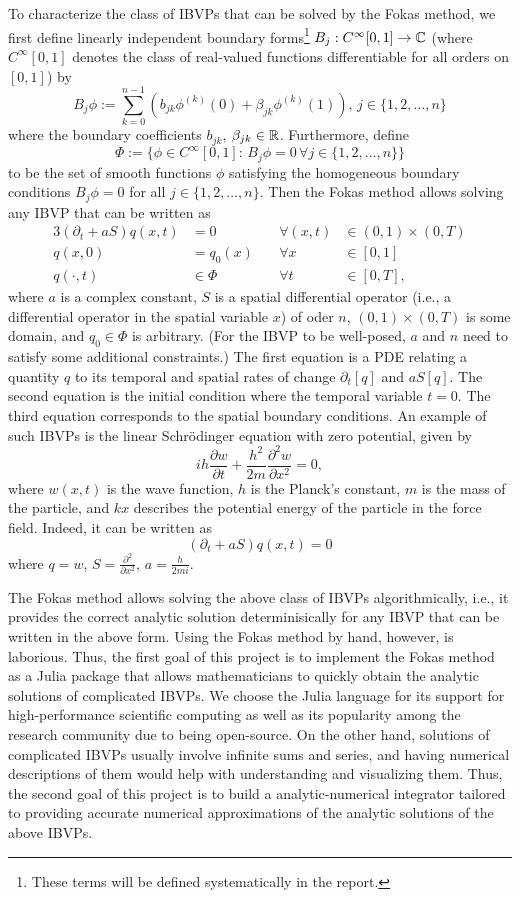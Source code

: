 \documentclass[11pt, oneside, a4paper]{article}
\begin{document}
To characterize the class of IBVPs that can be solved by the Fokas method\cite[p.9]{Smith2016}, we first define linearly independent boundary forms\footnote{These terms will be defined systematically in the report.} $B_j: C^\infty[0,1]\to \mathbb C$ (where $C^\infty[0,1]$ denotes the class of real-valued functions differentiable for all orders on $[0,1]$) by
\[B_j\phi := \sum_{k=0}^{n-1}\left(b_{jk}\phi^{(k)}(0) + \beta_{jk}\phi^{(k)}(1)\right),\, j\in\{1,2,\ldots,n\}\]
where the boundary coefficients $b_{jk}$, $\beta_{jk}\in\mathbb R$. Furthermore, define
\[\Phi:=\{\phi\in C^\infty[0,1]:\, B_j\phi = 0\,\forall j\in\{1,2,\ldots,n\}\}\]
to be the set of smooth functions $\phi$ satisfying the homogeneous boundary conditions $B_j\phi=0$ for all $j\in\{1,2,\ldots,n\}$.
Then the Fokas method allows solving any IBVP that can be written as
\begin{alignat*}{3}
    (\partial_t + aS)q(x,t) &= 0\quad &\forall (x,t)&\in (0,1)\times (0,T)\\
    q(x,0) &= q_0(x)\quad &\forall x&\in [0,1]\\
    q(\cdot, t) &\in \Phi \quad &\forall t&\in [0,T],
\end{alignat*}
where $a$ is a complex constant, $S$ is a spatial differential operator (i.e., a differential operator in the spatial variable $x$) of oder $n$, $(0,1)\times (0,T)$ is some domain, and $q_0\in \Phi$ is arbitrary. (For the IBVP to be well-posed, $a$ and $n$ need to satisfy some additional constraints.) The first equation is a PDE relating a quantity $q$ to its temporal and spatial rates of change $\partial_t[q]$ and $aS[q]$. The second equation is the initial condition where the temporal variable $t=0$. The third equation corresponds to the spatial boundary conditions. 
An example of such IBVPs is the linear Schr\"{o}dinger equation with zero potential, given by
\[ih\frac{\partial w}{\partial t} + \frac{h^2}{2m}\frac{\partial^2 w}{\partial x^2} = 0,\]
where $w(x,t)$ is the wave function, $h$ is the Planck's constant, $m$ is the mass of the particle, and $kx$ describes the potential energy of the particle in the force field. Indeed, it can be written as
\[(\partial_t + aS)q(x,t) = 0\]
where $q=w$, $S = \frac{\partial^2}{\partial x^2}$, $a = \frac{h}{2mi}$. 

The Fokas method allows solving the above class of IBVPs algorithmically, i.e., it provides the correct analytic solution determinisically for any IBVP that can be written in the above form. Using the Fokas method by hand, however, is laborious. Thus, the first goal of this project is to implement the Fokas method as a Julia package that allows mathematicians to quickly obtain the analytic solutions of complicated IBVPs. We choose the Julia language for its support for high-performance scientific computing as well as its popularity among the research community due to being open-source. On the other hand, solutions of complicated IBVPs usually involve infinite sums and series, and having numerical descriptions of them would help with understanding and visualizing them. Thus, the second goal of this project is to build a analytic-numerical integrator tailored to providing accurate numerical approximations of the analytic solutions of the above IBVPs.
\end{document}
